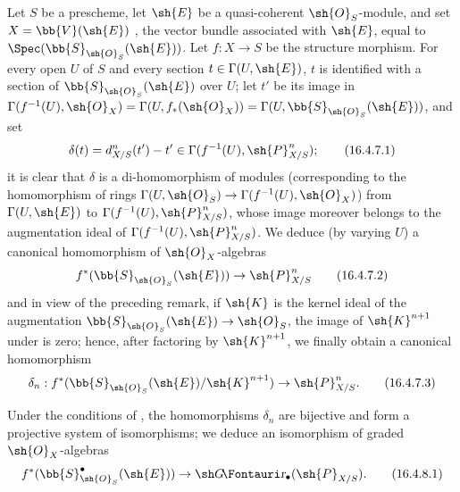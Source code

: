 \begin{env}[16.4.7]
\label{IV.16.4.7}
Let $S$ be a prescheme, let $\sh{E}$ be a quasi-coherent $\sh{O}_S$-module, and set $X = \bb{V}(\sh{E})$ , the vector bundle associated with $\sh{E}$, equal to $\Spec(\bb{S}_{\sh{O}_S}(\sh{E}))$.
Let $f:X \to S$ be the structure morphism.
For every open $U$ of $S$ and every section $t \in \Gamma(U, \sh{E})$, $t$ is identified with a section of $\bb{S}_{\sh{O}_S}(\sh{E})$ over $U$;
let $t'$ be its image in $\Gamma(f^{-1}(U), \sh{O}_X) = \Gamma(U, f_*(\sh{O}_X)) = \Gamma(U, \bb{S}_{\sh{O}_S}(\sh{E}))$, and set
\[
  \label{IV.16.4.7.1}
  \delta(t) = d_{X/S}^n(t') - t' \in \Gamma(f^{-1}(U), \sh{P}_{X/S}^n);
  \tag{16.4.7.1}
\]
it is clear that $\delta$ is a di-homomorphism of modules (corresponding to the homomorphism of rings $\Gamma(U, \sh{O}_S) \to \Gamma(f^{-1}(U), \sh{O}_X)$) from $\Gamma(U, \sh{E})$ to $\Gamma(f^{-1}(U), \sh{P}_{X/S}^n)$, whose image moreover belongs to the augmentation ideal of $\Gamma(f^{-1}(U), \sh{P}_{X/S}^n)$.
We deduce (by varying $U$) a canonical homomorphism of $\sh{O}_X$-algebras
\[
  \label{IV.16.4.7.2}
  f^*(\bb{S}_{\sh{O}_S}(\sh{E})) \to \sh{P}_{X/S}^n
  \tag{16.4.7.2}
\]
and in view of the preceding remark, if $\sh{K}$ is the kernel ideal of the augmentation $\bb{S}_{\sh{O}_S}(\sh{E}) \to \sh{O}_S$, the image of $\sh{K}^{n+1}$ under  is zero; hence, after factoring by $\sh{K}^{n+1}$, we finally obtain a canonical homomorphism
\[
  \label{IV.16.4.7.3}
  \delta_n: f^*(\bb{S}_{\sh{O}_S}(\sh{E})/\sh{K}^{n+1}) \to \sh{P}_{X/S}^n.
  \tag{16.4.7.3}
\]
\end{env} 

\begin{proposition}[16.4.8]
\label{IV.16.4.8}
Under the conditions of , the homomorphisms $\delta_n$ are bijective and form a projective system of isomorphisms;
we deduce an isomorphism of graded $\sh{O}_X$-algebras 
\[
  \label{IV.16.4.8.1}
  f^*(\bb{S}_{\sh{O}_S}^\bullet(\sh{E})) \to \shGr_\bullet(\sh{P}_{X/S}).
  \tag{16.4.8.1}
\]
\end{proposition}

